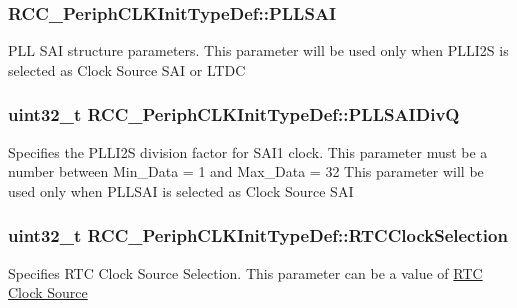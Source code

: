 \subsubsection[{\texorpdfstring{P\+L\+L\+S\+AI}{PLLSAI}}]{ R\+C\+C\+\_\+\+Periph\+C\+L\+K\+Init\+Type\+Def\+::\+P\+L\+L\+S\+AI}\hypertarget{struct_r_c_c___periph_c_l_k_init_type_def_a5bfc6178ab362422276fcc36be9ba7a9}{}\label{struct_r_c_c___periph_c_l_k_init_type_def_a5bfc6178ab362422276fcc36be9ba7a9}
P\+LL S\+AI structure parameters. This parameter will be used only when P\+L\+L\+I2S is selected as Clock Source S\+AI or L\+T\+DC 
\subsubsection[{\texorpdfstring{P\+L\+L\+S\+A\+I\+DivQ}{PLLSAIDivQ}}]{\setlength{\rightskip}{0pt plus 5cm}uint32\+\_\+t R\+C\+C\+\_\+\+Periph\+C\+L\+K\+Init\+Type\+Def\+::\+P\+L\+L\+S\+A\+I\+DivQ}\hypertarget{struct_r_c_c___periph_c_l_k_init_type_def_a08da65a7dcf29461768f246f37531cf5}{}\label{struct_r_c_c___periph_c_l_k_init_type_def_a08da65a7dcf29461768f246f37531cf5}
Specifies the P\+L\+L\+I2S division factor for S\+A\+I1 clock. This parameter must be a number between Min\+\_\+\+Data = 1 and Max\+\_\+\+Data = 32 This parameter will be used only when P\+L\+L\+S\+AI is selected as Clock Source S\+AI 
\subsubsection[{\texorpdfstring{R\+T\+C\+Clock\+Selection}{RTCClockSelection}}]{\setlength{\rightskip}{0pt plus 5cm}uint32\+\_\+t R\+C\+C\+\_\+\+Periph\+C\+L\+K\+Init\+Type\+Def\+::\+R\+T\+C\+Clock\+Selection}\hypertarget{struct_r_c_c___periph_c_l_k_init_type_def_ad2c422d62b056a61d7bbb599c89dbc1e}{}\label{struct_r_c_c___periph_c_l_k_init_type_def_ad2c422d62b056a61d7bbb599c89dbc1e}
Specifies R\+TC Clock Source Selection. This parameter can be a value of \hyperlink{group___r_c_c___r_t_c___clock___source}{R\+TC Clock Source} 
